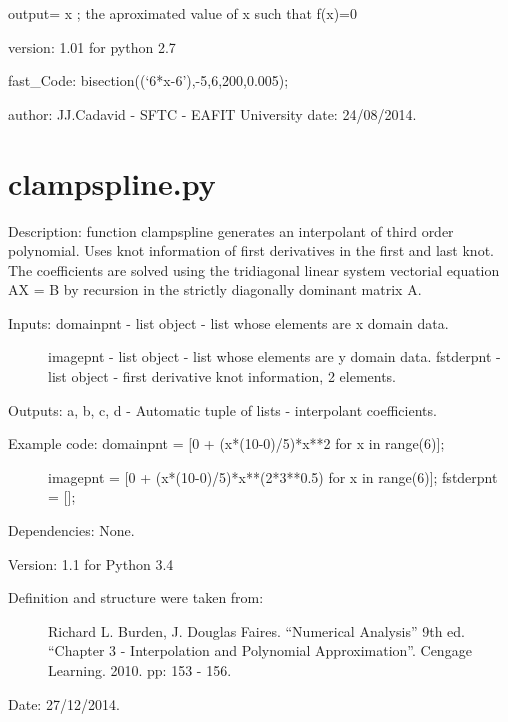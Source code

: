 \documentclass[letterpaper,10pt,oneside]{sphinxmanual}
\theoremstyle{plain}%
\theoremstyle{definition}%
\theoremstyle{remark}%
\begin{document}
output= x ; the aproximated value of x such that f(x)=0

version: 1.01 for python 2.7

fast\_Code: bisection((`6*x-6'),-5,6,200,0.005);

author: JJ.Cadavid - SFTC - EAFIT University
date: 24/08/2014.


\section{clampspline.py}
\label{code:module-clampspline}\label{code:clampspline-py}
Description: function clampspline generates an interpolant of third order 
polynomial. Uses knot information of first derivatives in the first and last
knot. The coefficients are solved using the tridiagonal linear system 
vectorial equation AX = B by recursion in the strictly diagonally dominant 
matrix A.
\begin{description}
\item[{Inputs: domainpnt - list object - list whose elements are x domain data.}] \leavevmode
imagepnt - list object - list whose elements are y domain data.
fstderpnt - list object - first derivative knot information, 2 elements.

\end{description}

Outputs: a, b, c, d - Automatic tuple of lists - interpolant coefficients.
\begin{description}
\item[{Example code: domainpnt = {[}0 + (x*(10-0)/5)*x**2 for x in range(6){]};}] \leavevmode
imagepnt = {[}0 + (x*(10-0)/5)*x**(2*3**0.5) for x in range(6){]};
fstderpnt = {[}{]};

\end{description}

Dependencies: None.

Version: 1.1 for Python 3.4
\begin{description}
\item[{Definition and structure were taken from:}] \leavevmode
Richard L. Burden, J. Douglas Faires. ``Numerical Analysis'' 9th ed.
``Chapter 3 - Interpolation and Polynomial Approximation''. 
Cengage Learning. 2010. pp: 153 - 156.

\end{description}




Date: 27/12/2014.
\end{document}
